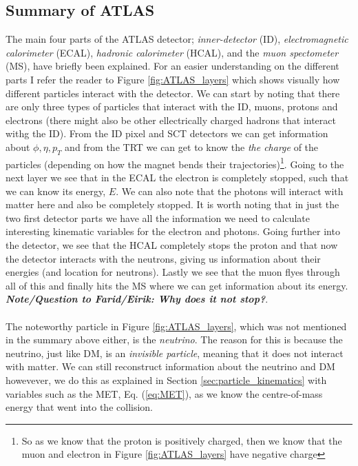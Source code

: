\documentclass[14pt, a4paper]{book}
\begin{document}
\subsection{Summary of ATLAS}
The main four parts of the ATLAS detector; \textit{inner-detector} (ID), \textit{electromagnetic calorimeter} (ECAL), \textit{hadronic calorimeter} (HCAL), and the \textit{muon spectometer} (MS), have 
briefly been explained. For an easier understanding on the different parts I refer the reader to Figure \ref{fig:ATLAS_layers} which shows visually how different particles interact with the detector. We can start by noting that there are only three types 
of particles that interact with the ID, muons, protons and electrons (there might also be other ellectrically charged hadrons that interact withg the ID). From the ID pixel and SCT detectors we can get information about $\phi,\eta, p_T$ and from the TRT we  
can get to know the \textit{the charge} of the particles (depending on how the magnet bends their trajectories)\footnote{So as we know that the proton is positively charged, then we know that the muon and electron in Figure \ref{fig:ATLAS_layers} have negative charge}. 
Going to the next layer we see that in the ECAL the electron is completely stopped, such that we can know its energy, $E$. We can also note that the photons will interact with matter here and also be completely stopped. It is worth noting that in just the two 
first detector parts we have all the information we need to calculate interesting kinematic variables for the electron and photons. Going further into the detector, we see that the HCAL completely stops the proton and that now the detector interacts with the neutrons, giving us 
information about their energies (and location for neutrons). Lastly we see that the muon flyes through all of this and finally hits the MS where we can get information about its energy. \textit{\textbf{Note/Question to Farid/Eirik: Why does it not stop?}}. \\
\\The noteworthy particle in Figure \ref{fig:ATLAS_layers}, which was not mentioned in the summary above either, is the \textit{neutrino}. The reason for this is because the neutrino, just like DM, is an \textit{invisible particle}, meaning that it does not 
interact with matter. We can still reconstruct information about the neutrino and DM howevever, we do this as explained in Section \ref{sec:particle_kinematics} with variables such as the MET, Eq. (\ref{eq:MET}), as we know the centre-of-mass energy that went 
into the collision. \\
\end{document}
